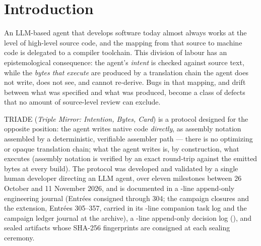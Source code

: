 \documentclass[11pt,a4paper]{article}
\begin{document}
\begin{otherlanguage}{french}
\begin{abstract}
spécifications qu'il vérifie, et la comparaison au compilateur de référence
partage le harnais du laboratoire ; la réplication indépendante (un second
développeur, un second domaine) demeure à mener. Ces limites sont
énoncées explicitement. Nous
revendiquons comme contribution l'\emph{intégration} — notation à
contrats d'abord, gouvernance à manifestes signés, vérification
oracle/terrain — en un seul pipeline pour le développement piloté par
agent, et non les primitives cryptographiques ou de test sous-jacentes,
qui sont standards.
\end{abstract}
\end{otherlanguage}

\section{Introduction}\label{sec:intro}

An LLM-based agent that develops software today almost always works at the
level of high-level source code, and the mapping from that source to
machine code is delegated to a compiler toolchain. This division of labour
has an epistemological consequence: the agent's \emph{intent} is checked
against source text, while the \emph{bytes that execute} are produced by a
translation chain the agent does not write, does not see, and cannot
re-derive. Bugs in that mapping, and drift between what was specified and
what was produced, become a class of defects that no amount of source-level
review can exclude.

TRIADE (\emph{Triple Mirror: Intention, Bytes, Card}) is a protocol
designed for the opposite position: the agent writes native code
\emph{directly}, as assembly notation assembled by a deterministic,
verifiable assembler path --- there is no optimizing or opaque translation
chain; what the agent writes is, by construction, what executes
(assembly notation is verified by an exact round-trip against the emitted
bytes at every build). The protocol was developed and validated by a
single human developer directing an LLM agent, over eleven milestones
between 26 October and 11 November 2026, and is documented in a
\nbLignesJournal-line append-only engineering journal (Entr\'ees
consigned through 304; the campaign closures and the extension,
Entr\'ees 305--357,
carried in its \nbLignesWorklog-line companion task log and the campaign
ledger journal at the archive), a \nbLignesDecisions-line append-only
decision log (\plageDecisions), and sealed artifacts whose
SHA-256 fingerprints are consigned at each sealing ceremony.
\end{document}
